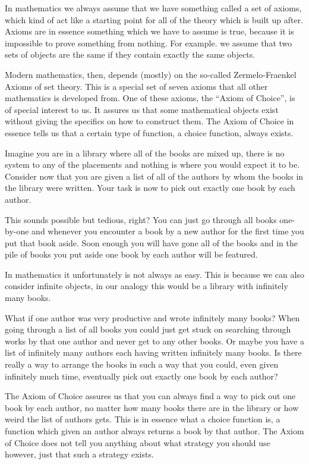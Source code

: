 \documentclass[../../main.tex]{subfiles}
\begin{document}
In mathematics we always assume that we have something called a set of axioms, 
which kind of act like a starting point for all of the theory which is built up after.
Axioms are in essence something which we have to assume is true, because it is impossible to prove something from nothing.
For example. we assume that two sets of objects are the same if they contain exactly the same objects.

Modern mathematics, then, depends (mostly) on the so-called Zermelo-Fraenkel Axioms of set theory.
This is a special set of seven axioms that all other mathematics is developed from.
One of these axioms, the ``Axiom of Choice'', is of special interest to us.
It assures us that some mathematical objects exist without giving the specifics on how to construct them.
The Axiom of Choice in essence tells us that a certain type of function, a choice function, always exists.

Imagine you are in a library where all of the books are mixed up, there is no system to any of the placements and nothing is where you would expect it to be.
Consider now that you are given a list of all of the authors by whom the books in the library were written.
Your task is now to pick out exactly one book by each author.

This sounds possible but tedious, right? 
You can just go through all books one-by-one and whenever you encounter a book by a new author for the first time you put that book aside.
Soon enough you will have gone all of the books and in the pile of books you put aside one book by each author will be featured.

In mathematics it unfortunately is not always as easy.
This is because we can also consider infinite objects, in our analogy this would be a library with infinitely many books.

What if one author was very productive and wrote infinitely many books?
When going through a list of all books you could just get stuck on searching through works by that one author and never get to any other books.
Or maybe you have a list of infinitely many authors each having written infinitely many books.
Is there really a way to arrange the books in such a way that you could, even given infinitely much time, eventually pick out exactly one book by each author?

The Axiom of Choice assures us that you can always find a way to pick out one book by each author, 
no matter how many books there are in the library or how weird the list of authors gets.
This is in essence what a choice function is, a function which given an author always returns a book by that author.
The Axiom of Choice does not tell you anything about what strategy you should use however, just that such a strategy exists.
\end{document}
